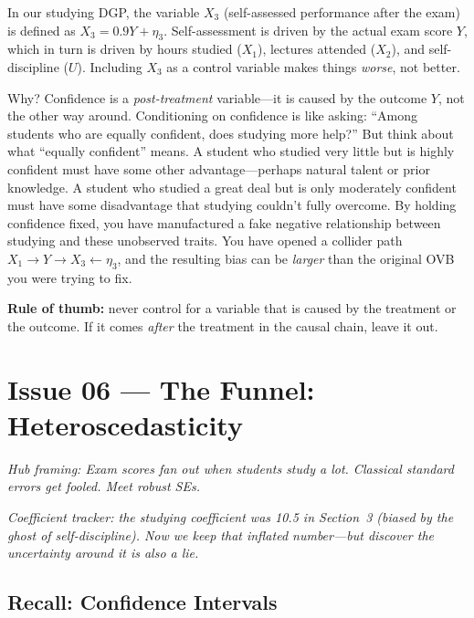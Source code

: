 \documentclass[11pt,a4paper]{article}
\theoremstyle{definition}
\theoremstyle{plain}
\theoremstyle{remark}
\begin{document}
\begin{warningbox}
In our studying DGP, the variable $X_3$ (self-assessed performance after the exam) is defined as $X_3 = 0.9 Y + \eta_3$. Self-assessment is driven by the actual exam score $Y$, which in turn is driven by hours studied ($X_1$), lectures attended ($X_2$), and self-discipline ($U$). Including $X_3$ as a control variable makes things \emph{worse}, not better.

Why? Confidence is a \emph{post-treatment} variable---it is caused by the outcome $Y$, not the other way around. Conditioning on confidence is like asking: ``Among students who are equally confident, does studying more help?'' But think about what ``equally confident'' means. A student who studied very little but is highly confident must have some other advantage---perhaps natural talent or prior knowledge. A student who studied a great deal but is only moderately confident must have some disadvantage that studying couldn't fully overcome. By holding confidence fixed, you have manufactured a fake negative relationship between studying and these unobserved traits. You have opened a collider path $X_1 \to Y \to X_3 \leftarrow \eta_3$, and the resulting bias can be \emph{larger} than the original OVB you were trying to fix.

\textbf{Rule of thumb:} never control for a variable that is caused by the treatment or the outcome. If it comes \emph{after} the treatment in the causal chain, leave it out.
\end{warningbox}


\section{Issue 06 --- The Funnel: Heteroscedasticity}\label{sec:hetero}

\noindent\emph{Hub framing: Exam scores fan out when students study a lot. Classical standard errors get fooled. Meet robust SEs.}

\noindent\textit{Coefficient tracker: the studying coefficient was 10.5 in Section~3 (biased by the ghost of self-discipline). Now we keep that inflated number---but discover the uncertainty around it is also a lie.}

\subsection{Recall: Confidence Intervals}
\end{document}
